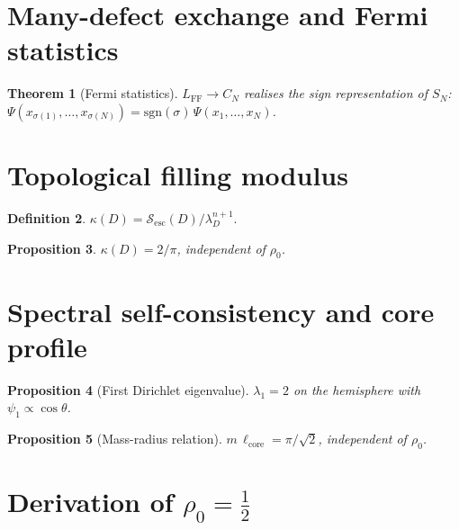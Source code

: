 \documentclass[12pt]{article}
\newtheorem{theorem}{Theorem}[section]
\newtheorem{proposition}[theorem]{Proposition}
\theoremstyle{definition}
\newtheorem{definition}[theorem]{Definition}
\theoremstyle{remark}
\begin{document}
\section{Many-defect exchange and Fermi statistics}
\label{sec:exchange}

\begin{theorem}[Fermi statistics]
$L_{\mathrm{FF}}\to C_N$ realises the sign representation of $S_N$:
$\Psi(x_{\sigma(1)},\ldots,x_{\sigma(N)})=\mathrm{sgn}(\sigma)\,\Psi(x_1,\ldots,x_N)$.
\end{theorem}

\section{Topological filling modulus}
\label{sec:filling}

\begin{definition}$\kappa(D)=\mathcal{S}_{\mathrm{esc}}(D)/\lambda_D^{n+1}$.\end{definition}

\begin{proposition}\label{prop:kappa}
$\kappa(D)=2/\pi$, independent of $\rho_0$.
\end{proposition}

\section{Spectral self-consistency and core profile}
\label{sec:spectral}

\begin{proposition}[First Dirichlet eigenvalue]\label{prop:lambda1}
$\lambda_1=2$ on the hemisphere with $\psi_1\propto\cos\theta$.
\end{proposition}

\begin{proposition}[Mass-radius relation]\label{prop:massradius}
$m\,\ell_{\mathrm{core}}=\pi/\sqrt{2}$, independent of $\rho_0$.
\end{proposition}

\section{Derivation of $\rho_0=\tfrac{1}{2}$}
\label{sec:rho0}
\end{document}
